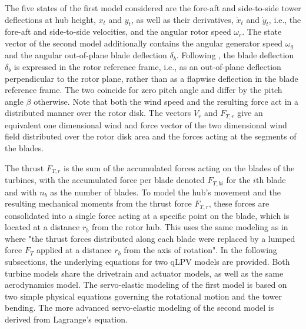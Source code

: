 The five states of the first model considered are the fore-aft and side-to-side tower deflections at hub height, $x_t$ and $y_t$, as well as their derivatives, $\dot{x}_t$ and $\dot{y}_t$, i.e., the fore-aft and side-to-side velocities, and the angular rotor speed $\omega_r$.
The state vector of the second model additionally contains the angular generator speed $\omega_g$ and the angular out-of-plane blade deflection $\delta_b$. Following \cite{Bianchi2007}, the blade deflection $\delta_b$ is expressed in the rotor reference frame, i.e., as an out-of-plane deflection perpendicular to the rotor plane, rather than as a flapwise deflection in the blade reference frame. The two coincide for zero pitch angle and differ by the pitch angle $\beta$ otherwise. Note that both the wind speed and the resulting force act in a distributed manner over the rotor disk. The vectors $V_r$ and $F_{T,r}$ give an equivalent one dimensional wind and force vector of the two dimensional wind field distributed over the rotor disk area and the forces acting at the segments of the blades.

 The thrust $F_{T,r}$ is the sum of the accumulated forces acting on the blades of the turbines, with the accumulated force per blade denoted $F_{T,bi}$ for the $i$th blade and with $n_b$ as the number of blades. To model the hub's movement and the resulting mechanical moments from the thrust force $F_{T,r}$, these forces are consolidated into a single force acting at a specific point on the blade, which is located at a distance $r_b$ from the rotor hub. This uses the same modeling as in \cite{Bianchi2007} where "the thrust forces distributed along each blade were
 replaced by a lumped force $F_T$ applied at a distance $r_b$ from the axis of rotation". 
In the following subsections, the underlying equations for two qLPV models are provided. Both turbine models share the drivetrain and actuator models, as well as the same aerodynamics model. The servo-elastic modeling of the first model is based on two simple physical equations governing the rotational motion and the tower bending. The more advanced servo-elastic modeling of the second model is derived from Lagrange's equation.

